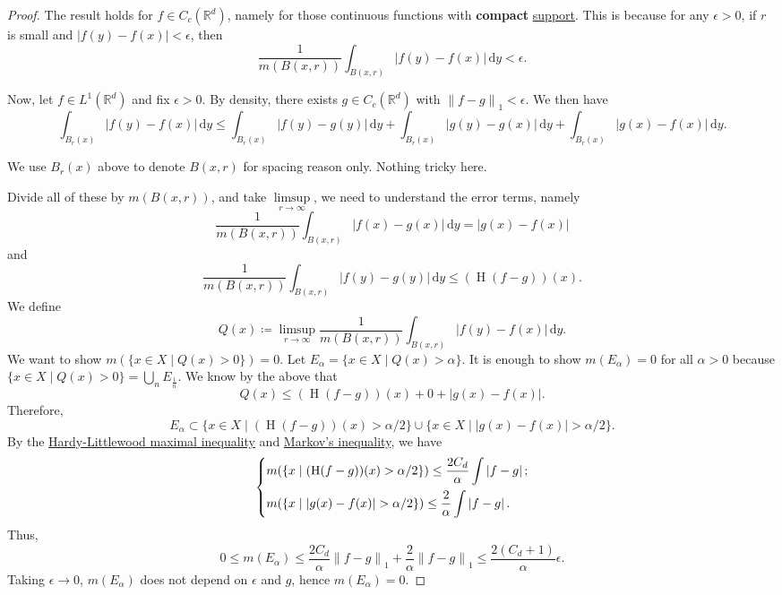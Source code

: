 \begin{proof}
	The result holds for \(f\in C_c(\mathbb{R} ^d)\), namely for those continuous functions with \textbf{compact} \hyperref[def:support]{support}.
	This is because for any \(\epsilon >0\), if \(r\) is small and \(\left\vert f(y) - f(x) \right\vert < \epsilon \), then
	\[
		\frac{1}{m(B(x, r))}\int _{B(x, r)}\left\vert f(y) - f(x) \right\vert \,\mathrm{d} y < \epsilon .
	\]

	Now, let \(f\in L^1(\mathbb{R} ^d)\) and fix \(\epsilon >0\). By density, there exists \(g\in C_c(\mathbb{R} ^d)\) with \(\left\lVert f-g\right\rVert _1<\epsilon \).
	We then have
	\[
		\int_{B_r(x)}\left\vert f(y) - f(x) \right\vert \,\mathrm{d} y
		\leq \int _{B_r(x)}\left\vert f(y) - g(y) \right\vert \,\mathrm{d} y
		+\int _{B_r(x)}\left\vert g(y) - g(x) \right\vert \,\mathrm{d} y
		+\int _{B_r(x)}\left\vert g(x) - f(x) \right\vert \,\mathrm{d} y.
	\]
	\begin{note}
		We use \(B_r(x)\) above to denote \(B(x, r)\) for spacing reason only. Nothing tricky here.
	\end{note}
	Divide all of these by \(m(B(x, r))\), and take \(\limsup\limits_{r \to \infty} \), we need to understand the error terms, namely
	\[
		\frac{1}{m(B(x, r))}\int _{B(x, r)}\left\vert f(x) - g(x) \right\vert \,\mathrm{d} y = \left\vert g(x) - f(x) \right\vert
	\]
	and
	\[
		\frac{1}{m(B(x, r))}\int _{B(x, r)}\left\vert f(y) - g(y) \right\vert \,\mathrm{d} y \leq (\operatorname{H} (f-g))(x).
	\]
	We define
	\[
		Q(x) \coloneqq \limsup_{r \to \infty} \frac{1}{m(B(x, r))}\int _{B(x, r)} \left\vert f(y) - f(x) \right\vert \,\mathrm{d} y.
	\]
	We want to show \(m(\{x\in X\mid Q(x) > 0\}) = 0\). Let \(E_\alpha = \{x\in X\mid Q(x) > \alpha \}\). It is enough to show \(m(E_\alpha ) = 0\)
	for all \(\alpha >0\) because \(\{x\in X\mid Q(x)> 0\}= \bigcup_n E_{\frac{1}{n}}\). We know by the above that
	\[
		Q(x) \leq (\operatorname{H} (f-g))(x) + 0 + \left\vert g(x) - f(x) \right\vert.
	\]
	Therefore,
	\[
		E_\alpha \subset \{x\in X\mid (\operatorname{H} (f-g))(x) > \alpha /2\}\cup \{x\in X\mid \left\vert g(x) - f(x) \right\vert >\alpha /2\}.
	\]
	By the \hyperref[thm:HL-maximal-inequality]{Hardy-Littlewood maximal inequality} and \hyperref[lma:Markov-inequality]{Markov's inequality}, we have
	\[
		\begin{dcases}
			m(\left\{x\mid (\operatorname{H}(f-g))(x) > \alpha / 2\right\})                \leq \frac{2C_{d} }{\alpha }\int \left\vert f - g \right\vert; \\
			m(\left\{x\mid \left\vert g(x) - f(x) \right\vert > \alpha / 2\right\})  \leq \frac{2}{\alpha }\int \left\vert f - g \right\vert.
		\end{dcases}
	\]
	Thus,
	\[
		0\leq m(E_\alpha )\leq \frac{2C_d}{\alpha }\left\lVert f-g\right\rVert _1 + \frac{2}{\alpha }\left\lVert f-g\right\rVert _1 \leq \frac{2(C_{d} +1)}{\alpha }\epsilon.
	\]
	Taking \(\epsilon \to 0\), \(m(E_\alpha )\) does not depend on \(\epsilon \) and \(g\), hence \(m(E_\alpha) = 0\).
\end{proof}
